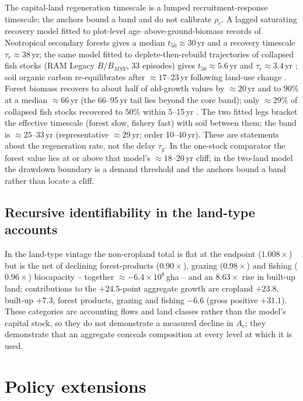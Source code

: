\documentclass[11pt,a4paper]{article}
\begin{document}
The capital-land regeneration timescale is a lumped recruitment-response timescale; the anchors bound a band and do not calibrate $\rho_c$. A lagged saturating recovery model fitted to plot-level age--above-ground-biomass records of Neotropical secondary forests \citep[2ndFOR;][1{,}334 plots, 41 chronosequences, 35 good fits]{Poorter2016} gives a median $t_{50}\approx30$\,yr and a recovery timescale $\tau_r\approx38$\,yr; the same model fitted to deplete-then-rebuild trajectories of collapsed fish stocks (RAM Legacy $B/B_{MSY}$, 33 episodes) gives $t_{50}\approx5.6$\,yr and $\tau_r\approx3.4$\,yr \citep[cf.][]{HutchingsReynolds2004,Neubauer2013}; soil organic carbon re-equilibrates after $\approx17$--$23$\,yr following land-use change \citep{Poeplau2011}. Forest biomass recovers to about half of old-growth values by $\approx20$\,yr and to $90\%$ at a median $\approx66$\,yr \citep{Poorter2016} (the 66--95\,yr tail lies beyond the core band); only $\approx29\%$ of collapsed fish stocks recovered to $50\%$ within 5--15\,yr \citep{HutchingsReynolds2004}. The two fitted legs bracket the effective timescale (forest slow, fishery fast) with soil between them; the band is $\approx25$--$33$\,yr (representative $\approx29$\,yr; order 10--40\,yr). These are statements about the regeneration rate, not the delay $\tau_g$. In the one-stock comparator the forest value lies at or above that model's $\approx18$--$20$\,yr cliff; in the two-land model the drawdown boundary is a demand threshold and the anchors bound a band rather than locate a cliff.

\subsection{Recursive identifiability in the land-type accounts}\label{si:recursive}

In the land-type vintage the non-cropland total is flat at the endpoint ($1.008\times$) but is the net of declining forest-products ($0.90\times$), grazing ($0.98\times$) and fishing ($0.96\times$) biocapacity -- together $\approx-6.4\times10^{8}$\,gha -- and an $8.63\times$ rise in built-up land; contributions to the $+24.5$-point aggregate growth are cropland $+23.8$, built-up $+7.3$, forest products, grazing and fishing $-6.6$ (gross positive $+31.1$). These categories are accounting flows and land classes rather than the model's capital stock, so they do not demonstrate a measured decline in $A_c$; they demonstrate that an aggregate conceals composition at every level at which it is used.
\section{Policy extensions}\label{si:policy}
\end{document}
